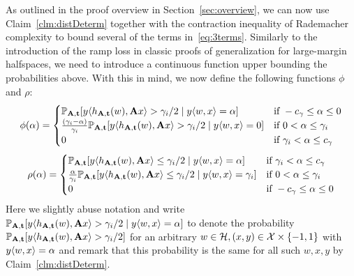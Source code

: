 As outlined in the proof overview in Section~\ref{sec:overview}, we can now use Claim~\ref{clm:distDeterm} together with the contraction inequality of Rademacher complexity to bound several of the terms in~\eqref{eq:3terms}. Similarly to the introduction of the ramp loss in classic proofs of generalization for large-margin halfspaces, we need to introduce a continuous function upper bounding the probabilities above. With this in mind, we now define the following functions $\phi$ and $\rho$:
\[
\phi(\alpha) = \begin{cases} \mathbb{P}_{\mathbf{A}, \mathbf{t}}[y \langle h_{\mathbf{A},\mathbf{t}}(w), \mathbf{A} x\rangle > \gamma_i/2 \mid y \langle w, x \rangle = \alpha] & \text{if } -c_\gamma \leq \alpha \leq 0 \\
                      \frac{(\gamma_i-\alpha)}{\gamma_i}\mathbb{P}_{\mathbf{A}, \mathbf{t}}[y \langle h_{\mathbf{A},\mathbf{t}}(w), \mathbf{A} x\rangle > \gamma_i/2 \mid y \langle w, x \rangle = 0]                                    & \text{if } 0 < \alpha \leq \gamma_i      \\
                      0 & \text{if } \gamma_i < \alpha \leq c_\gamma
        \end{cases}
\]
\[
\rho(\alpha) = \begin{cases} \mathbb{P}_{\mathbf{A}, \mathbf{t}}[y \langle h_{\mathbf{A},\mathbf{t}}(w), \mathbf{A} x\rangle \leq \gamma_i/2 \mid y \langle w, x \rangle = \alpha] & \text{if } \gamma_i < \alpha \leq c_\gamma\\
                      \frac{\alpha}{\gamma_i}\mathbb{P}_{\mathbf{A}, \mathbf{t}}[y \langle h_{\mathbf{A},\mathbf{t}}(w), \mathbf{A} x\rangle \leq \gamma_i/2 \mid y \langle w, x \rangle = \gamma_i]                                    & \text{if } 0 < \alpha \leq \gamma_i      \\
                      0 & \text{if } -c_\gamma \leq \alpha \leq 0
        \end{cases}
\]
Here we slightly abuse notation and write $\mathbb{P}_{\mathbf{A}, \mathbf{t}}[y \langle h_{\mathbf{A},\mathbf{t}}(w), \mathbf{A} x\rangle > \gamma_i/2 \mid y \langle w, x \rangle = \alpha]$ to denote the probability $\mathbb{P}_{\mathbf{A}, \mathbf{t}}[y \langle h_{\mathbf{A},\mathbf{t}}(w), \mathbf{A} x\rangle > \gamma_i/2]$ for an arbitrary $w \in \mathcal{H}, (x,y) \in \mathcal{X} \times \{-1,1\}$ with $y \langle w,x\rangle=\alpha$ and remark that this probability is the same for all such $w,x,y$ by Claim~\ref{clm:distDeterm}.

